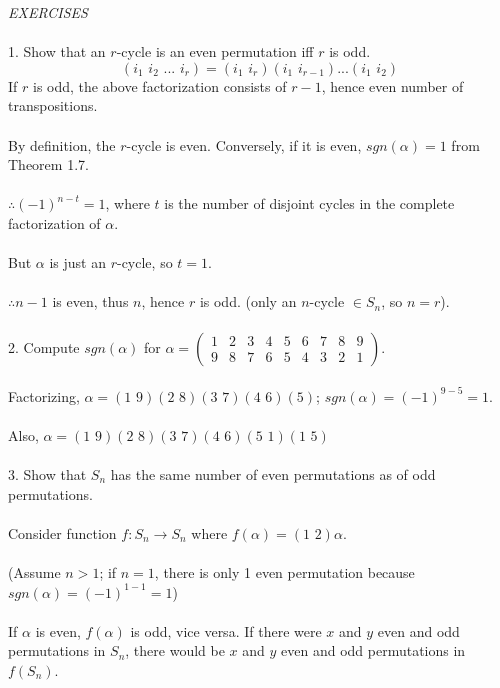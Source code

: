 \documentclass{article}
\begin{document}
\begin{siderules}\color{blue}
\textit{EXERCISES}\\\\
1. Show that an \(r\)-cycle is an even permutation iff \(r\) is odd.\color{black}
\[(i_1\,\,i_2\,\,...\,\,i_r)=(i_1\,\,i_r)(i_1\,\,i_{r-1})...(i_1\,\,i_2)\]
\null\qquad If \(r\) is odd, the above factorization consists of \(r-1\), hence even number of transpositions.\\\\
\null\qquad By definition, the \(r\)-cycle is even. Conversely, if it is even, \(sgn(\alpha)=1\) from \color{gray}Theorem 1.7\color{black}.\\\\
\null\qquad \(\therefore(-1)^{n-t}=1\), where \(t\) is the number of disjoint cycles in the complete factorization of \(\alpha\).\\\\
\null\qquad But \(\alpha\) is just an \(r\)-cycle, so \(t=1\).\\\\
\null\qquad\(\therefore n-1\) is even, thus \(n\), hence \(r\) is odd. (only an \(n\)-cycle \(\in S_n\), so \(n=r\)).\\\\
\color{blue}2. Compute \(sgn(\alpha)\) for \(\alpha=\begin{pmatrix}1 & 2 & 3 & 4 & 5 & 6 & 7 & 8 & 9\\9 & 8 & 7 & 6 & 5 & 4 & 3 & 2 & 1\end{pmatrix}\).\\\\\color{black}
\null\qquad Factorizing, \(\alpha=(1\,\,9)(2\,\,8)(3\,\,7)(4\,\,6)(5)\); \(sgn(\alpha)=(-1)^{9-5}=1\).\\\\
\null\qquad Also, \(\alpha=(1\,\,9)(2\,\,8)(3\,\,7)(4\,\,6)(5\,\,1)(1\,\,5)\)\\\\
\color{blue}3. Show that \(S_n\) has the same number of even permutations as of odd permutations.\\\\\color{black}
\null\qquad Consider function \(f:S_n\rightarrow S_n\) where \(f(\alpha)=(1\,\,2)\alpha\).\\\\
\null\qquad (Assume \(n>1\); if \(n=1\), there is only 1 even permutation because \(sgn(\alpha)=(-1)^{1-1}=1 \))\\\\
\null\qquad If \(\alpha\) is even, \(f(\alpha)\) is odd, vice versa. If there were \(x\) and \(y\) even and odd permutations in \(S_n\), there would be \(x\) and \(y\) even and odd permutations in \(f(S_n)\).\\\\

\end{siderules}
\end{document}
